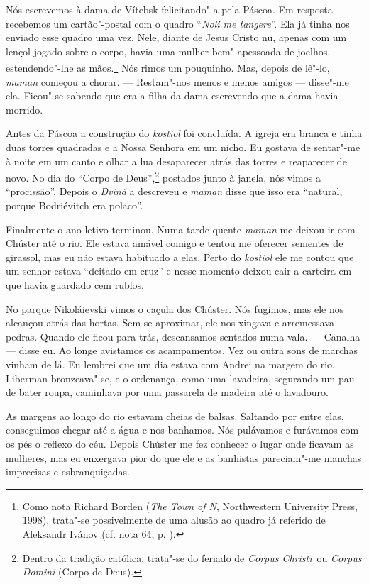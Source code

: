 Nós escrevemos à dama de Vítebsk felicitando"-a pela Páscoa. Em resposta
recebemos um cartão"-postal com o quadro ``\emph{Noli me tangere}''. Ela
já tinha nos enviado esse quadro uma vez. Nele, diante de Jesus Cristo
nu, apenas com um lençol jogado sobre o corpo, havia uma mulher
bem"-apessoada de joelhos, estendendo"-lhe as mãos.\footnote{Como nota
  Richard Borden (\emph{The Town of N}, Northwestern University Press,
  1998), trata"-se possivelmente de uma alusão ao quadro já referido de
  Aleksandr Ivánov (cf. nota 64, p. \pageref{noli}).} Nós rimos um pouquinho. Mas,
depois de lê"-lo, \emph{maman} começou a chorar. --- Restam"-nos menos e
menos amigos --- disse"-me ela. Ficou"-se sabendo que era a filha da dama
escrevendo que a dama havia morrido.

Antes da Páscoa a construção do \emph{kostiol} foi concluída. A igreja
era branca e tinha duas torres quadradas e a Nossa Senhora em um nicho.
Eu gostava de sentar"-me à noite em um canto e olhar a lua desaparecer
atrás das torres e reaparecer de novo. No dia do ``Corpo de
Deus'',\footnote{Dentro da tradição católica, trata"-se do feriado de
  \emph{Corpus Christi}~ou \emph{Corpus Domini} (Corpo de Deus).}
postados junto à janela, nós vimos a ``procissão''. Depois o
\emph{Dviná} a descreveu e \emph{maman} disse que isso era ``natural,
porque Bodriévitch era polaco''.

Finalmente o ano letivo terminou. Numa tarde quente \emph{maman} me
deixou ir com Chúster até o rio. Ele estava amável comigo e tentou me
oferecer sementes de girassol, mas eu não estava habituado a elas. Perto
do \emph{kostiol} ele me contou que um senhor estava ``deitado em cruz''
e nesse momento deixou cair a carteira em que havia guardado cem rublos.

No parque Nikoláievski vimos o caçula dos Chúster. Nós fugimos, mas ele
nos alcançou atrás das hortas. Sem se aproximar, ele nos xingava e
arremessava pedras. Quando ele ficou para trás, descansamos sentados
numa vala. --- Canalha --- disse eu. Ao longe avistamos os acampamentos.
Vez ou outra sons de marchas vinham de lá. Eu lembrei que um dia estava
com Andrei na margem do rio, Liberman bronzeava"-se, e o ordenança, como
uma lavadeira, segurando um pau de bater roupa, caminhava por uma
passarela de madeira até o lavadouro.

As margens ao longo do rio estavam cheias de balsas. Saltando por entre
elas, conseguimos chegar até a água e nos banhamos. Nós pulávamos e
furávamos com os pés o reflexo do céu. Depois Chúster me fez conhecer o
lugar onde ficavam as mulheres, mas eu enxergava pior do que ele e as
banhistas pareciam"-me manchas imprecisas e esbranquiçadas.

